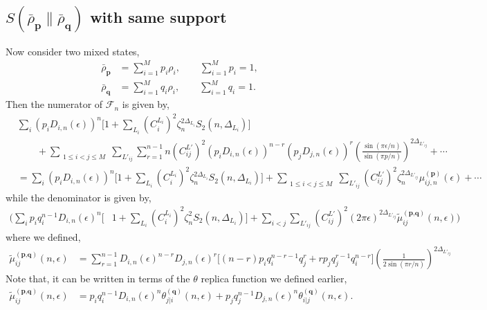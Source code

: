 \documentclass[11pt]{article}
\newcommand{\ep}{\epsilon}
\newcommand{\nn}{\nonumber}
\newcommand{\lb}{\left(}
\newcommand{\rb}{\right)}
\begin{document}
\subsection{\texorpdfstring{$S(\bar{\rho}_\textbf{p}\| \bar{\rho}_\textbf{q})$ with same support}{S rho bar p wrt rho bar q}}
Now consider two mixed states,
\begin{align}
    \bar{\rho}_\textbf{p} &= \sum_{i=1}^M p_i\rho_i, \qquad \sum_{i=1}^M p_i = 1, \\
    \bar{\rho}_\textbf{q} &= \sum_{i=1}^Mq_i \rho_i,\qquad  \sum_{i=1}^Mq_i = 1.
\end{align}
Then the numerator of $\mathcal{F}_n$ is given by,
\begin{align}
    &\sum_i  \lb p_iD_{i,n}(\ep)\rb^n \big[  1+ \sum_{L_i}{(C^{L_i}_i)}^2 \zeta_n^{2\Delta_{L_i}} S_2(n,\Delta_{L_i})\big] \nn \\
    &\qquad + \displaystyle\sum_{\substack{1\leq i<j\leq M}}\sum_{L'_{ij}}\sum_{r=1}^{n-1} n\lb C_{ij}^{L'}\rb^2\lb p_iD_{i,n}(\ep)\rb^{n-r}\lb p_jD_{j,n}(\ep)\rb ^r \lb\frac{\sin (\pi \ep/n)}{\sin (\pi p/n)}\rb^{2\Delta_{L'_{ij}}}+  \cdots  \\
    &=\sum_i  \lb p_iD_{i,n}(\ep)\rb^n \big[  1+ \sum_{L_i}{(C^{L_i}_i)}^2 \zeta_n^{2\Delta_{L_i}} S_2(n,\Delta_{L_i})\big] + \displaystyle\sum_{\substack{1\leq i<j\leq M}}\sum_{L'_{ij}} \lb C_{ij}^{L'}\rb^2 \zeta_n^{2\Delta_{L'_{ij}}} \mu_{ij,n}^{(\textbf{p})}(\ep) +\cdots
\end{align}
while the denominator is given by,
\begin{align}
    \Bigg(  \sum_i p_i q_i^{n-1}D_{i,n}(\ep)^n\big[&1+ \sum_{L_i}{(C^{L_i}_i)}^2 \zeta_n^2S_2(n,\Delta_{L_i})\big] + \sum_{i<j}\sum_{L'_{ij}}\lb C_{ij}^{L'}\rb^2 (2\pi\ep)^{2\Delta_{L'_{ij}}}\tilde{\mu}_{ij}^{(\textbf{p,q})}(n,\ep)\Bigg)
\end{align}
where we defined,
\begin{align}
    \tilde{\mu}_{ij}^{(\textbf{p,q})}(n,\ep) &= \sum_{r=1}^{n-1} D_{i,n}(\ep)^{n-r}D_{j,n}(\ep)^r\big[(n-r)p_iq_i^{n-r-1}q_j^r + rp_jq_j^{r-1}q_i^{n-r}\big]\lb\frac{1}{2\sin (\pi r/n)}\rb^{2\Delta_{L'_{ij}}}
\end{align}
Note that, it can be written in terms of the $\theta$ replica function we defined earlier,
\begin{align}
    \tilde{\mu}_{ij}^{(\textbf{p,q})}(n,\ep) &= p_i q_i^{n-1}D_{i,n}(\ep)^n\theta_{j|i}^{(\textbf{q})}(n,\ep) + p_j q_j^{n-1}D_{j,n}(\ep)^n\theta_{i|j}^{(\textbf{q})} (n,\ep).
\end{align}
\end{document}
